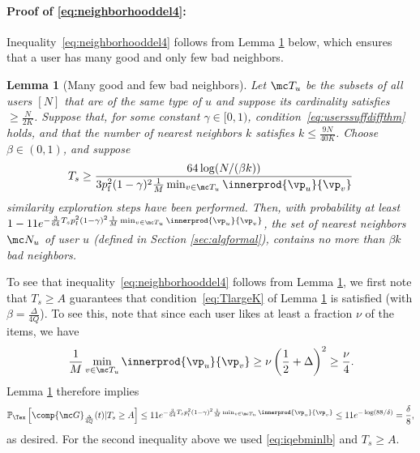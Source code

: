 \documentclass{article}
\newtheorem{lemma}{Lemma}
\newcommand\pf{p_{\mathrm{f}}}
\renewcommand\PR[2][\Tex]{
\ifthenelse{\equal{#1}{}}{{\mathbb P}\left[#2\right]}{\ensuremath{{\mathbb P}_{#1}\left[ #2\right]}}}
\begin{document}
\paragraph{Proof of \eqref{eq:neighborhooddel4}:}
Inequality~\eqref{eq:neighborhooddel4} follows from Lemma \ref{lem:mgfb} below, which ensures that a user has many good and only few bad neighbors. 
%
\begin{lemma}[Many good and few bad neighbors]
Let $\mc T_u$ be the subsets of all users $[N]$ that are of the same type of $u$ and suppose its cardinality satisfies $\geq \frac{N}{2K}$. 
Suppose that, for some constant $\gamma \in [0,1)$, 
condition~\eqref{eq:userssuffdiffthm} holds, and that the number of nearest neighbors $k$ satisfies $k \leq   \frac{9N}{40K}$. 
Choose $\beta \in (0,1)$, 
and suppose 
\begin{align}
 T_s  
\geq 
\frac{64 \log(N/(\beta k ))}{ 3  \pf^2  (1 - \gamma)^2 \frac{1}{M} \min_{v\in \mc T_u} \innerprod{\vp_u}{\vp_v} }
\label{eq:TlargeK}
\end{align}
similarity exploration steps have been performed. 
Then, with probability at least
$1 - 11 e^{ - \frac{3}{ 64 }  T_s  \pf^2 (1-\gamma)^2  \frac{1}{M}  \min_{v\in \mc T_u} \innerprod{\vp_u}{\vp_v} }$,
the set of nearest neighbors $\mc N_u$ of user $u$ (defined in Section \ref{sec:algformal}), contains no more than $\beta k$ bad neighbors. 
\label{lem:mgfb}
\end{lemma}
To see that inequality~\eqref{eq:neighborhooddel4} follows from Lemma \ref{lem:mgfb}, we first note that $T_s \geq A$ guarantees that condition~\eqref{eq:TlargeK} of Lemma \ref{lem:mgfb} is satisfied (with $\beta = \frac{\Delta}{4Q}$). To see this, note that since each user likes at least a fraction $\nu$ of the items, we have
\begin{align}
\frac{1}{M} \min_{v\in \mc T_u} \innerprod{\vp_u}{\vp_v}
\geq \nu \left( \frac{1}{2} + \Delta \right)^2 \geq \frac{\nu}{4}. 
\label{eq:iqebminlb}
\end{align}
Lemma \ref{lem:mgfb} therefore implies 
\[
\PR{ \comp{\mc G}_{\frac{\Delta}{4Q}}(t) | T_s \geq A }
%
\leq 
11 e^{ - \frac{3}{ 64 }  T_s  \pf^2 (1-\gamma)^2  \frac{1}{M}  \min_{v\in \mc T_u} \innerprod{\vp_u}{\vp_v} }
%
\leq
 11 e^{- \log(88/\delta)}
= \frac{\delta}{8},
\]
as desired. 
For the second inequality above we used \eqref{eq:iqebminlb} and $T_s \geq A$. 



\end{document}
